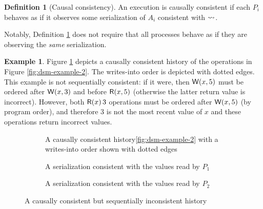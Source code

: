 \documentclass[]             %
{NASA}                       %
\theoremstyle{definition}
\newtheorem{example}[theorem]{Example}
\newtheorem{definition}[theorem]{Definition}
\begin{document}
%    
%    

\begin{definition}[Causal consistency]
  \label{def:causalconsistency}
  An execution is causally consistent if each $P_i$ behaves as if it
  observes some serialization of $A_i$ consistent with $\rightsquigarrow$.
\end{definition}

Notably, Definition \ref{def:causalconsistency} does not require that
all processes behave as if they are observing the \emph{same}
serialization.

\begin{example}
  \label{ex:dsm-causal-ex1}
  Figure \ref{fig:dsm-causal-ex1} depicts a causally consistent
  history of the operations in Figure \ref{fig:dsm-example-2}. The
  writes-into order is depicted with dotted edges. This example is not
  sequentially consistent: if it were, then $\mathsf{W}\!\left(x, 5\right)$ must be
  ordered after $\mathsf{W}\!\left(x, 3\right)$ and before $\mathsf{R}\!\left(x, 5\right)$
  (otherwise the latter return value is incorrect). However, both
  $\mathsf{R}\!\left(x\right){3}$ operations must be ordered after $\mathsf{W}\!\left(x, 5\right)$
  (by program order), and therefore $3$ is not the most recent value
  of $x$ and these operations return incorrect values.
\end{example}

\begin{figure}
  \setlength\belowcaptionskip{5ex}
  \begin{subfigure}{1\textwidth}
    \centering
    
    \caption{A causally consistent history\ref{fig:dsm-example-2} with a writes-into order shown with dotted edges}
    \label{fig:dsm-causal-ex1}
  \end{subfigure}
  \begin{subfigure}{1\textwidth}
    \centering
    
    \caption{A serialization consistent with the values read by $P_1$}
    \label{fig:dsm-causal-ex1-serial1}
  \end{subfigure}
  \begin{subfigure}{1\textwidth}
    \centering
    
    \caption{A serialization consistent with the values read by $P_2$}
    \label{fig:dsm-causal-ex1-serial2}
  \end{subfigure}
  \caption{A causally consistent but sequentially inconsistent history}
\end{figure}
\end{document}
